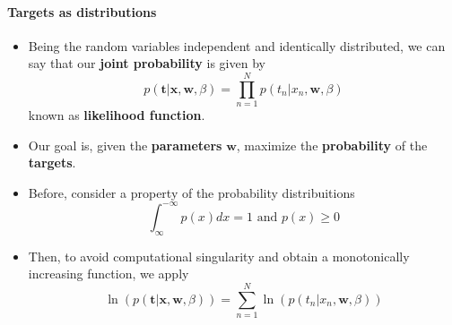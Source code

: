 \begin{frame}{\insertsubsection}	
	\framesubtitle{Targets as distributions}
	\begin{itemize}
		\item Being the random variables independent and identically distributed, we can say that our \textcolor{UniOrange}{\textbf{joint probability}} is given by
	\begin{equation*}
		p(\mathbf{t} | \mathbf{x}, \mathbf{w}, \beta) = \prod_{n=1}^N p \left( t_n | x_n, \mathbf{w}, \beta \right)
	\end{equation*}
		known as \textcolor{UniOrange}{\textbf{likelihood function}}.
		\item Our goal is, given the \textcolor{UniOrange}{\textbf{parameters}} $\mathbf{w}$, maximize the \textcolor{UniOrange}{\textbf{probability}} of the \textcolor{UniOrange}{\textbf{targets}}.
		\item  Before, consider a property of the probability distribuitions
		\begin{equation*}
		\int_\infty ^{-\infty} p(x) dx = 1 \text{ and } p(x) \geq 0
		\end{equation*}
		\item Then, to avoid computational singularity and obtain a monotonically increasing function, we apply
		\begin{equation*}
			\ln \left( p( \mathbf{t}| \mathbf{x}, \mathbf{w}, \beta) \right) = \sum_{n=1}^N \ln \left(   p \left( t_n | x_n, \mathbf{w}, \beta \right) \right)
		\end{equation*}		
	\end{itemize}
\end{frame}

